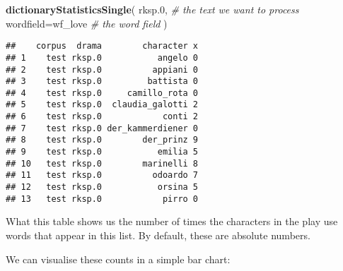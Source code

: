 \documentclass[]{book}
\newenvironment{Shaded}{\begin{snugshade}}{\end{snugshade}}
\newcommand{\CommentTok}[1]{\textcolor[rgb]{0.56,0.35,0.01}{\textit{#1}}}
\newcommand{\DataTypeTok}[1]{\textcolor[rgb]{0.13,0.29,0.53}{#1}}
\newcommand{\DecValTok}[1]{\textcolor[rgb]{0.00,0.00,0.81}{#1}}
\newcommand{\FloatTok}[1]{\textcolor[rgb]{0.00,0.00,0.81}{#1}}
\newcommand{\KeywordTok}[1]{\textcolor[rgb]{0.13,0.29,0.53}{\textbf{#1}}}
\newcommand{\NormalTok}[1]{#1}
\newcommand{\OperatorTok}[1]{\textcolor[rgb]{0.81,0.36,0.00}{\textbf{#1}}}
\newcommand{\StringTok}[1]{\textcolor[rgb]{0.31,0.60,0.02}{#1}}
\begin{document}
\begin{Shaded}
\begin{Highlighting}[]
\KeywordTok{dictionaryStatisticsSingle}\NormalTok{(}
\NormalTok{  rksp}\FloatTok{.0}\NormalTok{,              }\CommentTok{# the text we want to process}
  \DataTypeTok{wordfield=}\NormalTok{wf_love    }\CommentTok{# the word field}
\NormalTok{)}
\end{Highlighting}
\end{Shaded}

\begin{verbatim}
##    corpus  drama        character x
## 1    test rksp.0           angelo 0
## 2    test rksp.0          appiani 0
## 3    test rksp.0         battista 0
## 4    test rksp.0     camillo_rota 0
## 5    test rksp.0  claudia_galotti 2
## 6    test rksp.0            conti 2
## 7    test rksp.0 der_kammerdiener 0
## 8    test rksp.0        der_prinz 9
## 9    test rksp.0           emilia 5
## 10   test rksp.0        marinelli 8
## 11   test rksp.0          odoardo 7
## 12   test rksp.0           orsina 5
## 13   test rksp.0            pirro 0
\end{verbatim}

What this table shows us the number of times the characters in the play use words that appear in this list. By default, these are absolute numbers.

We can visualise these counts in a simple bar chart:

\begin{Shaded}
\end{Shaded}
\end{document}
